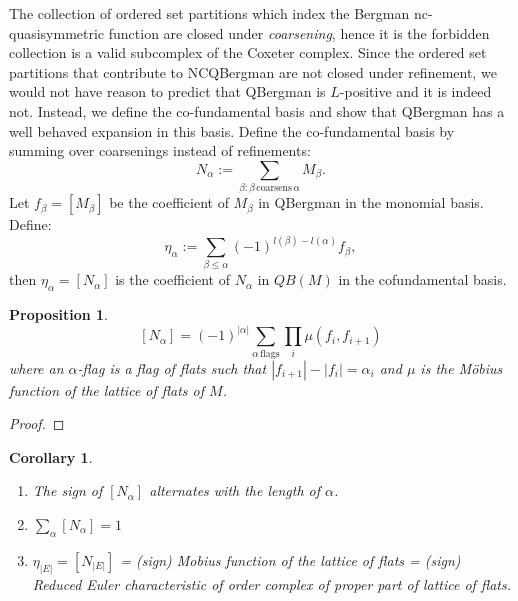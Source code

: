 \documentclass[12pt,reqno]{amsart}
\numberwithin{definition}{section}
\newtheorem{proposition}[definition]{Proposition}
\newtheorem{corollary}[definition]{Corollary}
\theoremstyle{definition}
\begin{document}
The collection of ordered set partitions which index the Bergman
nc-quasisymmetric function are closed under {\em coarsening}, hence it
is the forbidden collection is a valid subcomplex of the Coxeter
complex.  Since the ordered set partitions that contribute to
NCQBergman are not closed under refinement, we would not have reason
to predict that QBergman is $L$-positive and it is indeed not.
 Instead, we define the co-fundamental basis and show that QBergman
 has a well behaved expansion in this basis.
Define the co-fundamental basis by summing over coarsenings instead of refinements:
$$ N_{\alpha} := \sum_{\beta : \beta \, \textrm{coarsens} \, \alpha} M_{\beta}.$$
Let $f_{\beta} = [M_{\beta}]$ be the coefficient of $M_{\beta}$ in
QBergman in the monomial basis.  Define: 
$$\eta_{\alpha} := \sum_{\beta \leq \alpha} (-1)^{l(\beta)-l(\alpha)}f_{\beta},$$
then $\eta_{\alpha} = [N_{\alpha}]$ is the coefficient of $N_{\alpha}$ in $QB(M)$ in the cofundamental basis.


\begin{proposition}
$$[N_{\alpha}] = (-1)^{|\alpha|} \sum_{\alpha \, \textrm{flags}} \prod_i \mu(f_i,f_{i+1})$$
where an $\alpha$-flag is a flag of flats such that $|f_{i+1}| - |f_i| = \alpha_i$ and $\mu$ is the M\"{o}bius function of the lattice of flats of $M$.
\end{proposition}

\begin{proof}
\end{proof}

\begin{corollary}
\begin{enumerate}
\item The sign of $[N_{\alpha}]$ alternates with the length of $\alpha$.  
\item $\sum_{\alpha} [N_{\alpha}] = 1$ 
\item $\eta_{|E|} = [N_{|E|}]$ = (sign) Mobius function of the lattice
of flats = (sign) Reduced Euler characteristic of order complex of
proper part of lattice of flats.
\end{enumerate}
\end{corollary}
\end{document}
